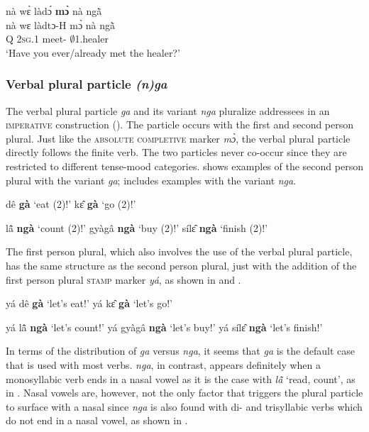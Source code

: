 \ea \label{absmo7}
  \glll     nà wɛ̀  làdɔ́ {\bfseries mɔ̀} nà ngã̀ \\
          nà wɛ  làdtɔ-H mɔ̀ nà ngã̀ \\
           Q 2\textsc{sg}.{\PST}1  meet-{\R} {\COMPL} {\COM} $\emptyset$1.healer  \\
    \trans `Have you ever/already met the healer?'
\z









\subsubsection{Verbal plural particle {\itshape (n)ga}}
\label{sec:nga}

The verbal plural particle {\itshape ga} and its variant {\itshape nga} pluralize addressees in an \textsc{imperative} construction (). The particle occurs with the first and second person plural. Just like the \textsc{absolute completive} marker {\itshape mɔ̀}, the verbal plural particle directly follows the finite verb. The two particles never co-occur since they are restricted to different tense-mood categories.  shows examples of the second person plural with the variant {\itshape ga};  includes examples with the variant {\itshape nga}.

\ea \label{gaimp1}
  \ea  dê {\bfseries gà} `eat (2{\PL})!'
\ex kɛ̂ {\bfseries gà} `go (2{\PL})!'
\z
\z


\ea \label{ngaimp1}
  \ea \label{ngaimp1a} lã̂ {\bfseries ngà} `count (2{\PL})!'
\ex\label{ngaimp1b} gyàgâ {\bfseries ngà} `buy (2{\PL})!'
\ex sílɛ̂ {\bfseries ngà} `finish (2{\PL})!'
\z
\z

\largerpage
The first person plural, which also involves the use of the verbal plural particle, has the same structure as the second person plural, just with the addition of the first person plural \textsc{stamp} marker {\itshape yá}, as shown in  and . 

\ea \label{gaimp1y}
  \ea  yá dê {\bfseries gà} `let's eat!'
\ex yá kɛ̂ {\bfseries gà} `let's go!'
\z
\z

\ea \label{ngaimp1y}
  \ea \label{ngaimp1x} yá lã̂ {\bfseries ngà} `let's count!'
\ex\label{ngaimp1z} yá gyàgâ {\bfseries ngà} `let's buy!'
\ex yá sílɛ̂ {\bfseries ngà} `let's finish!'
\z
\z


In terms of the  distribution of {\itshape ga} versus {\itshape nga}, it seems that {\itshape ga} is the default case that is used with most verbs. {\itshape nga}, in contrast, appears definitely when a monosyllabic verb ends in a nasal vowel as it is the case with {\itshape lã̂}  `read, count', as in .  Nasal vowels are, however, not the only factor that triggers the plural particle to surface with a nasal since {\itshape nga} is also found with di- and trisyllabic verbs which do not end in a nasal vowel, as shown in .



